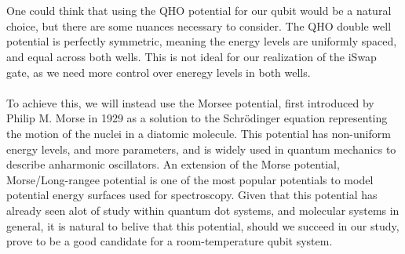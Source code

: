 \documentclass{subfiles}
\begin{document}
\\ \\ One could think that using the QHO potential for our qubit would be a natural choice, but there are some nuances necessary to consider. The QHO double well potential is perfectly symmetric, meaning the energy levels are uniformly spaced, and equal across both wells. This is not ideal for our realization of the iSwap gate, as we need more control over eneregy levels in both wells. \\ \\ To achieve this, we will instead use the Morsee potential, first introduced by Philip M. Morse in 1929 as a solution to the Schrödinger equation representing the motion of the nuclei in a diatomic molecule\cite{morse1929diatomic}. This potential has non-uniform energy levels, and more parameters, and is widely used in quantum mechanics to describe anharmonic oscillators. An extension of the Morse potential, Morse/Long-rangee potential is one of the most popular potentials to model potential energy surfaces used for spectroscopy\cite{zhai2018constructing}. Given that this potential has already seen alot of study within quantum dot systems, and molecular systems in general, it is natural to belive that this potential, should we succeed in our study, prove to be a good candidate for a room-temperature qubit system. \\ \\ 
\end{document}
